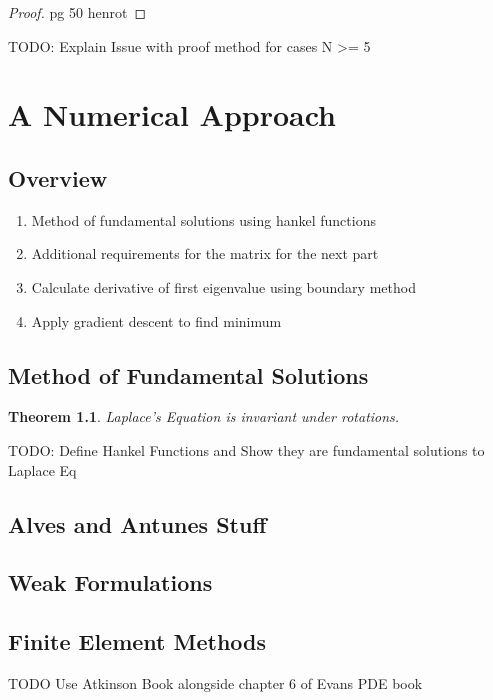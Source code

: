\documentclass[12pt]{report}
\newtheorem{theorem}{Theorem}[section]
\numberwithin{definition}{section}
\begin{document}
\begin{proof}
  pg 50 henrot
\end{proof}

TODO: Explain Issue with proof method for cases N >= 5

\break





\printbibliography

\chapter{A Numerical Approach}
\break

\section{Overview}
\begin{enumerate}
  \item Method of fundamental solutions using hankel functions
  \item Additional requirements for the matrix for the next part
  \item Calculate derivative of first eigenvalue using boundary method
  \item Apply gradient descent to find minimum
\end{enumerate}
\break

\section {Method of Fundamental Solutions}
\begin{theorem}
  Laplace's Equation is invariant under rotations.
\end{theorem}

TODO: Define Hankel Functions and Show they are fundamental solutions to Laplace Eq

\break

\section{Alves and Antunes Stuff}
\break

\section{Weak Formulations}
\break

\section{Finite Element Methods}
TODO Use Atkinson Book alongside chapter 6 of Evans PDE book

 
 
 
\end{document}
